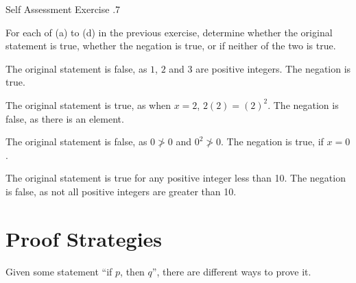 \documentclass[\main/notes.tex]{subfiles}
\begin{document}
			\begin{exercise}{Self Assessment Exercise \thechapter.7}
				
				\begin{questions}
					\item For each of (a) to (d) in the previous exercise, determine whether the original statement is true, whether the negation is true, or if neither of the two is true.
					\begin{questions}[label=(\alph*)]
						\item {\answer The original statement is false, as $1$, $2$ and $3$ are positive integers. The negation is true.}
						\item {\answer The original statement is true, as when $x = 2$, $2(2) = (2)^{2}$. The negation is false, as there is an element.}
						\item {\answer The original statement is false, as $0 \not > 0$ and $0^{2} \not > 0$. The negation is true, if $x = 0$.}
						\item {\answer The original statement is true for any positive integer less than 10. The negation is false, as not all positive integers are greater than 10.}
					\end{questions}
				\end{questions}
			\end{exercise}
		\section{Proof Strategies}
				Given some statement ``if $p$, then $q$'', there are different ways to prove it.
\end{document}
